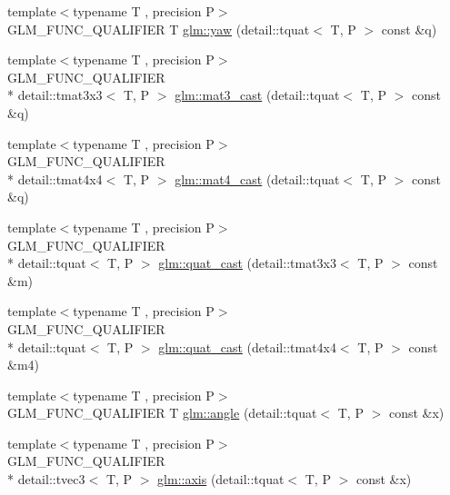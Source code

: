 \begin{DoxyCompactItemize}
\item 
{\footnotesize template$<$typename T , precision P$>$ }\\G\-L\-M\-\_\-\-F\-U\-N\-C\-\_\-\-Q\-U\-A\-L\-I\-F\-I\-E\-R T \hyperlink{group__gtc__quaternion_ga1de7653ddf380ff06d2300eea831664c}{glm\-::yaw} (detail\-::tquat$<$ T, P $>$ const \&q)
\item 
{\footnotesize template$<$typename T , precision P$>$ }\\G\-L\-M\-\_\-\-F\-U\-N\-C\-\_\-\-Q\-U\-A\-L\-I\-F\-I\-E\-R \\*
detail\-::tmat3x3$<$ T, P $>$ \hyperlink{group__gtc__quaternion_ga65257c3494022ad80a50ce11da95049d}{glm\-::mat3\-\_\-cast} (detail\-::tquat$<$ T, P $>$ const \&q)
\item 
{\footnotesize template$<$typename T , precision P$>$ }\\G\-L\-M\-\_\-\-F\-U\-N\-C\-\_\-\-Q\-U\-A\-L\-I\-F\-I\-E\-R \\*
detail\-::tmat4x4$<$ T, P $>$ \hyperlink{group__gtc__quaternion_gafc4e34c836f7ccb5f3bb2a0373c831e0}{glm\-::mat4\-\_\-cast} (detail\-::tquat$<$ T, P $>$ const \&q)
\item 
{\footnotesize template$<$typename T , precision P$>$ }\\G\-L\-M\-\_\-\-F\-U\-N\-C\-\_\-\-Q\-U\-A\-L\-I\-F\-I\-E\-R \\*
detail\-::tquat$<$ T, P $>$ \hyperlink{group__gtc__quaternion_gafb826745dedb1760100bbd25d0f63fde}{glm\-::quat\-\_\-cast} (detail\-::tmat3x3$<$ T, P $>$ const \&m)
\item 
{\footnotesize template$<$typename T , precision P$>$ }\\G\-L\-M\-\_\-\-F\-U\-N\-C\-\_\-\-Q\-U\-A\-L\-I\-F\-I\-E\-R \\*
detail\-::tquat$<$ T, P $>$ \hyperlink{group__gtc__quaternion_ga385af22ef1a45c4464ddd28b80d5ce18}{glm\-::quat\-\_\-cast} (detail\-::tmat4x4$<$ T, P $>$ const \&m4)
\item 
{\footnotesize template$<$typename T , precision P$>$ }\\G\-L\-M\-\_\-\-F\-U\-N\-C\-\_\-\-Q\-U\-A\-L\-I\-F\-I\-E\-R T \hyperlink{group__gtc__quaternion_ga23a3fc7ada5bbb665ff84c92c6e0542c}{glm\-::angle} (detail\-::tquat$<$ T, P $>$ const \&x)
\item 
{\footnotesize template$<$typename T , precision P$>$ }\\G\-L\-M\-\_\-\-F\-U\-N\-C\-\_\-\-Q\-U\-A\-L\-I\-F\-I\-E\-R \\*
detail\-::tvec3$<$ T, P $>$ \hyperlink{group__gtc__quaternion_ga8eef9f8c3f2e4836dccf09df975b20fb}{glm\-::axis} (detail\-::tquat$<$ T, P $>$ const \&x)

\end{DoxyCompactItemize}
